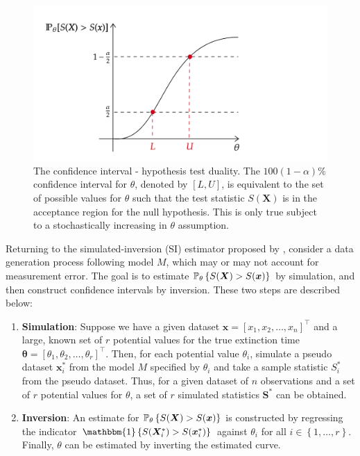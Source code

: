 \begin{figure}[ht]
    \centering
    \includegraphics[width=\linewidth]{figures/inversion-diagram.png}
    \caption{The confidence interval - hypothesis test duality. The $100(1-\alpha)\%$ confidence interval for $\theta$, denoted by $[L, U]$, is equivalent to the set of possible values for $\theta$ such that the test statistic $S(\bm{X})$ is in the acceptance region for the null hypothesis. This is only true subject to a stochastically increasing in $\theta$ assumption.}
    \label{fig:inversion_diagram}
\end{figure}

Returning to the simulated-inversion (SI) estimator proposed by \citet{Huang2019}, consider a data generation process following model $M$, which may or may not account for measurement error. The goal is to estimate $\mathbb{P}_\theta\left\{S(\bm{X}) > S(\bm{x})\right\}$ by simulation, and then construct confidence intervals by inversion. These two steps are described below:

\begin{enumerate}
    \item \textbf{Simulation}: Suppose we have a given dataset $\bm{x} = [x_1, x_2, \dots, x_n]^\top$ and a large, known set of $r$ potential values for the true extinction time $\bm{\theta} = [\theta_1, \theta_2, \dots, \theta_r]^\top$. Then, for each potential value $\theta_i$, simulate a pseudo dataset $\bm{x}^*_i$ from the model $M$ specified by $\theta_i$ and take a sample statistic $S^*_i$ from the pseudo dataset. Thus, for a given dataset of $n$ observations and a set of $r$ potential values for $\theta$, a set of $r$ simulated statistics $\bm{S}^*$ can be obtained.
    \item \textbf{Inversion}: An estimate for $\mathbb{P}_\theta\left\{S(\bm{X}) > S(\bm{x})\right\}$ is constructed by regressing the indicator $\mathbbm{1}\left\{ S(\bm{X}^*_i) > S(\bm{x}^*_i) \right\}$ against $\theta_i$ for all $i \in \left\{ 1, \dots, r \right\}$. Finally, $\theta$ can be estimated by inverting the estimated curve.
\end{enumerate}

